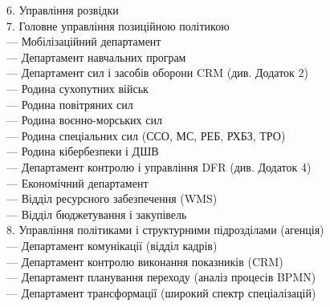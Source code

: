 6. Управління розвідки \\
7. Головне управління позиційною політикою \\
\hspace*{0.25cm}     — Мобілізаційний департамент \\
\hspace*{0.25cm}     — Департамент навчальних програм \\
\hspace*{0.25cm}     — Департамент сил і засобів оборони CRM (див. Додаток 2) \\
\hspace*{0.7cm}         — Родина сухопутних військ \\
\hspace*{0.7cm}         — Родина повітряних сил \\
\hspace*{0.7cm}         — Родина воєнно-морських сил \\
\hspace*{0.7cm}         — Родина спеціальних сил (ССО, МС, РЕБ, РХБЗ, ТРО) \\
\hspace*{0.7cm}         — Родина кібербезпеки і ДШВ \\
\hspace*{0.25cm}     — Департамент контролю і управління DFR (див. Додаток 4) \\
\hspace*{0.25cm}     — Економічний департамент \\
\hspace*{0.7cm}         — Відділ ресурсного забезпечення (WMS) \\
\hspace*{0.7cm}         — Відділ бюджетування і закупівель \\
8. Управління політиками і структурними підрозділами (агенція) \\
\hspace*{0.25cm}     — Департамент комунікації (відділ кадрів) \\
\hspace*{0.25cm}     — Департамент контролю виконання показників (CRM) \\
\hspace*{0.25cm}     — Департамент планування переходу (аналіз процесів BPMN) \\
\hspace*{0.25cm}     — Департамент трансформації (широкий спектр спеціалізацій) \\

